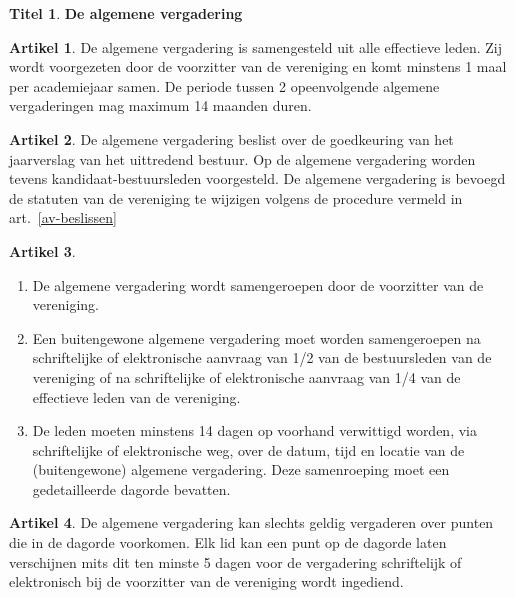 \documentclass[a4paper,10pt]{article}
\theoremstyle{definition}
\newtheorem{titel}{\newline\Large Titel}
\newtheorem{artikelbase}{\large Artikel}
\newenvironment{artikel}
  {\begin{artikelbase}}
  {\smallskip
   \end{artikelbase}}
\newcommand{\ttext}[1]{\Large \textbf{#1} \normalsize}
\newcommand{\ttextcr}{\hfill\newline}
\newcommand{\ttextenum}{\mbox{}}
\begin{document}
\begin{titel}\ttext{De algemene vergadering}

  \begin{artikel}\ttextcr
    De algemene vergadering is samengesteld uit alle effectieve leden.
    Zij wordt voorgezeten door de voorzitter van de vereniging en komt minstens 1 maal per academiejaar samen.
    De periode tussen 2 opeenvolgende algemene vergaderingen mag maximum 14 maanden duren.
  \end{artikel}

  \begin{artikel}\ttextcr
    De algemene vergadering beslist over de goedkeuring van het jaarverslag van het uittredend bestuur.
    Op de algemene vergadering worden tevens kandidaat-bestuursleden voorgesteld.
    De algemene vergadering is bevoegd de statuten van de vereniging te wijzigen volgens de procedure vermeld in art.~\ref{av-beslissen}
  \end{artikel}

  \begin{artikel}\label{av-samenroeping}\ttextenum
    \begin{enumerate}
      \item
        De algemene vergadering wordt samengeroepen door de voorzitter van de vereniging.
      \item
        Een buitengewone algemene vergadering moet worden samengeroepen na schriftelijke of elektronische aanvraag van 1/2 van de bestuursleden van de vereniging of na schriftelijke of elektronische aanvraag van 1/4 van de effectieve leden van de vereniging.
      \item\label{av-samenroeping-verwittiging}
        De leden moeten minstens 14 dagen op voorhand verwittigd worden, via schriftelijke of elektronische weg, over de datum, tijd en locatie van de (buitengewone) algemene vergadering.
        Deze samenroeping moet een gedetailleerde dagorde bevatten.
    \end{enumerate}
  \end{artikel}

  \begin{artikel}\label{av-dagorde}\ttextcr
    De algemene vergadering kan slechts geldig vergaderen over punten die in de dagorde voorkomen.
    Elk lid kan een punt op de dagorde laten verschijnen mits dit ten minste 5 dagen voor de vergadering schriftelijk of elektronisch bij de voorzitter van de vereniging wordt ingediend.
  \end{artikel}


\end{titel}
\end{document}
